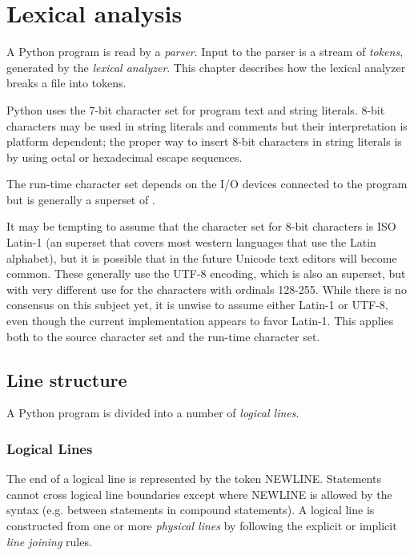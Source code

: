 \chapter{Lexical analysis}

A Python program is read by a \emph{parser}.  Input to the parser is a
stream of \emph{tokens}, generated by the \emph{lexical analyzer}.  This
chapter describes how the lexical analyzer breaks a file into tokens.

Python uses the 7-bit \ASCII{} character set for program text and string
literals. 8-bit characters may be used in string literals and comments
but their interpretation is platform dependent; the proper way to
insert 8-bit characters in string literals is by using octal or
hexadecimal escape sequences.

The run-time character set depends on the I/O devices connected to the
program but is generally a superset of \ASCII{}.

 It may be tempting to assume that the
character set for 8-bit characters is ISO Latin-1 (an \ASCII{}
superset that covers most western languages that use the Latin
alphabet), but it is possible that in the future Unicode text editors
will become common.  These generally use the UTF-8 encoding, which is
also an \ASCII{} superset, but with very different use for the
characters with ordinals 128-255.  While there is no consensus on this
subject yet, it is unwise to assume either Latin-1 or UTF-8, even
though the current implementation appears to favor Latin-1.  This
applies both to the source character set and the run-time character
set.

\section{Line structure}

A Python program is divided into a number of \emph{logical lines}.

\subsection{Logical Lines}

The end of
a logical line is represented by the token NEWLINE.  Statements cannot
cross logical line boundaries except where NEWLINE is allowed by the
syntax (e.g. between statements in compound statements).
A logical line is constructed from one or more \emph{physical lines}
by following the explicit or implicit \emph{line joining} rules.

